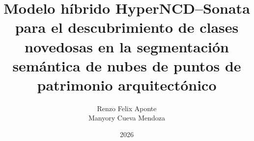 \documentclass[a4paper,12pt,oneside]{tesisutec}
\begin{document}
\frontmatter


\title{Modelo híbrido HyperNCD--Sonata para el descubrimiento de clases
novedosas en la segmentación semántica de nubes de puntos de patrimonio
arquitectónico}

\author{Renzo Felix Aponte  \\
        Manyory Cueva Mendoza }

\date{2026}

\maketitle





\tableofcontents

\newpage

\listoftables

\newpage

\listoffigures


\mainmatter
\pagestyle{fancy}








\renewcommand{\bibname}{\hfill\Large\bf{REFERENCIAS BIBLIOGRÁFICAS}\hfill}




\end{document}
